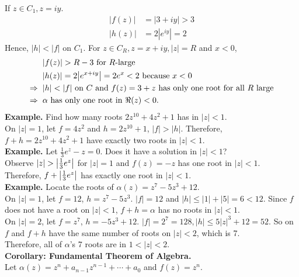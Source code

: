 \documentclass[11pt]{article}
\DeclarePairedDelimiter\abs{\lvert}{\rvert}
\begin{document}
If $z \in C_1, z = iy$. 
\begin{align*}
|f(z)| &= | 3+iy| > 3 \\
|h(z)| &= 2|e^{iy}| = 2
\end{align*} 
Hence, $|h| < |f| $ on $C_1$. For $z \in C_R, z = x + iy, |z| = R$ and $x < 0$, 
\begin{align*}
&|f(z)| > R - 3 \text{ for } R \text{-large} \\
&|h(z)| = 2\abs*{e^{x + iy}} = 2e^x < 2 \text{ because } x < 0 \\ 
\Rightarrow \hspace{2mm} & |h| < |f| \text{ on } C \text{ and } f(z) = 3 + z \text{ has only one root for all } R \text{ large} \\
\Rightarrow \hspace{2mm} & \alpha \text{ has only one root in } \Re(z) < 0.
\end{align*}
\textbf{Example.} Find how many roots $2z^{10} + 4z^2 + 1$ has in $|z| < 1$. \\
On $|z| = 1$, let $f = 4z^2$ and $h = 2z^{10} + 1$, $ |f| > |h|$. Therefore, $f + h = 2z^{10} + 4z^2 + 1$ have exactly two roots in $|z| < 1$. \\
\newline
\textbf{Example.} Let $\frac{1}{3}e^z - z = 0$. Does it have a solution in $|z| < 1$? \\
Observe $|z| > \abs*{\frac{1}{3}e^z}$ for $|z| = 1$ and $f(z) = -z$ has one root in $|z| < 1$. Therefore, $f + \abs*{\frac{1}{3}e^z}$ has exactly one root in $|z| < 1$.\\
\newline
\textbf{Example.} Locate the roots of $\alpha(z) = z^7 - 5z^3 + 12$. \\
On $|z| = 1$, let $f = 12$, $h = z^7 - 5z^3$. $|f| = 12$ and $|h| \leqslant |1| + |5| = 6 < 12$. Since $f$ does not have a root on $|z| < 1$, $f + h = \alpha$ has no roots in $|z| < 1$. \\
On $|z| = 2$, let $f = z^7$, $h = -5z^3 + 12$. $|f| = 2^7 = 128, |h| \leqslant 5|z|^3 +12 = 52$. So on $f$ and $f + h$ have the same number of roots on $|z| < 2$, which is 7. \\
Therefore, all of $\alpha$'s 7 roots are in $1 < |z| < 2$. \\
\newline
\textbf{Corollary: Fundamental Theorem of Algebra. } \\
Let $\alpha(z) = z^n + a_{n - 1}z^{n - 1} + \cdots + a_0$ and $f(z) = z^n$. \\
\end{document}
